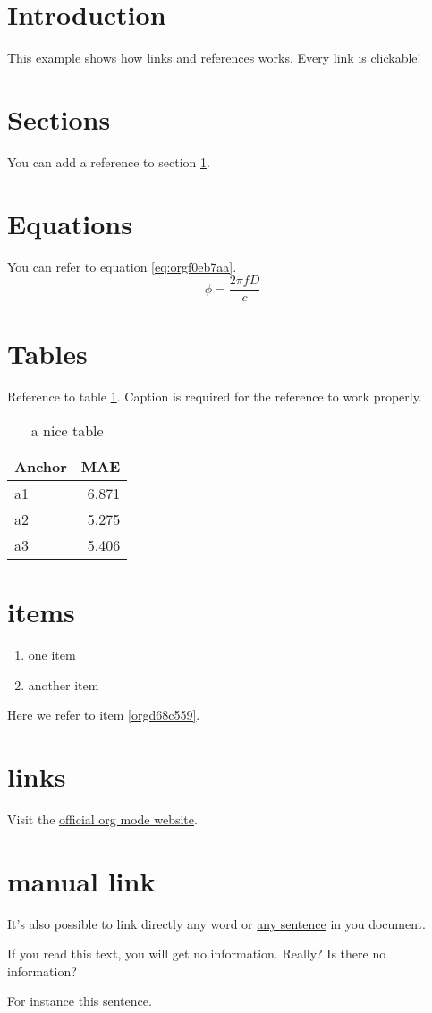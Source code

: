


\section{Introduction}
\label{sec:org6c7641a}
This example shows how links and references works.
Every link is clickable!

\section{Sections}
\label{sec:org1283877}
You can add a reference to section \ref{sec:org6c7641a}.

\section{Equations}
\label{sec:orga9ddf83}
You can refer to equation \ref{eq:orgf0eb7aa}.
\begin{equation}
\label{eq:orgf0eb7aa}
\phi = \frac{2\pi fD}{c}
\end{equation}

\section{Tables}
\label{sec:org85e7a06}
Reference to table \ref{tab:org0ad5cbd}.
Caption is required for the reference to work properly.

\begin{table}[htbp]
\caption{\label{tab:org0ad5cbd}
a nice table}
\centering
\begin{tabular}{lr}
Anchor & MAE\\
\hline
a1 & 6.871\\
a2 & 5.275\\
a3 & 5.406\\
\end{tabular}
\end{table}

\section{items}
\label{sec:org53def9f}
\begin{enumerate}
\item one item
\item \label{orgd68c559}another item
\end{enumerate}
Here we refer to item \ref{orgd68c559}.

\section{links}
\label{sec:orgad43aec}
Visit the \href{https://orgmode.org/}{official org mode website}.

\section{manual link}
\label{sec:org02233c8}
It's also possible to link directly any word
or \hyperlink{thesentence}{any sentence} in you document.

If you read this text, you will get no information.  Really?
Is there no information?

For instance \hypertarget{thesentence}{this sentence}.


